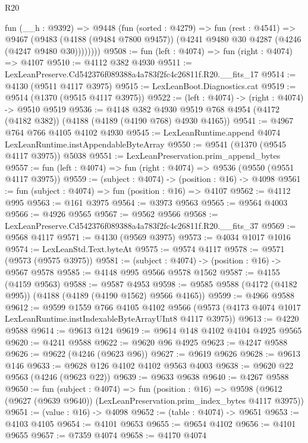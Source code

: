 \begin{lexlean}{R20}
\begin{coremodule}
        fun (__h : @9392) =>
        @9448
          (fun (sorted : @4279) =>
          fun (rest : @4541) =>
          @9467
            (@9483
              (@4188 (@9484 @7800 @9457))
              (@4241 @9480 @30 @4287 (@4246 (@4247 @9480 @30))))))))
@9508 := fun (left : @4074) => fun (right : @4074) => @4107
@9510 := @4112 @382 @4930
@9511 := LexLeanPreserve.Cd542376f089388a4a783f2fc4c26811f.R20.__fits_17
@9514 := @4130 (@9511 @4117 @3975)
@9515 := LexLeanBoot.Diagnostics.cat
@9519 := @9514 (@1370 (@9515 @4117 @3975))
@9522 := (left : @4074) -> (right : @4074) -> @9510 @9519
@9536 := @4148
    @382
    @4930
    @9519
    @768
    @4954
    (@4172 (@4182 @382))
    (@4188 (@4189 (@4190 @768) @4930 @4165))
@9541 := @4967 @764 @766 @4105 @4102 @4930
@9545 := LexLeanRuntime.append @4074 LexLeanRuntime.instAppendableByteArray
@9550 := @9541 (@1370 (@9545 @4117 @3975)) @5038
@9551 := LexLeanPreservation.prim_append_bytes
@9557 := fun (left : @4074) => fun (right : @4074) => @9536 (@9550 (@9551 @4117 @3975))
@9559 := (subject : @4074) -> (position : @16) -> @4098
@9561 := fun (subject : @4074) => fun (position : @16) => @4107
@9562 := @4112 @995
@9563 := @161 @3975
@9564 := @3973 @9563
@9565 := @9564 @4003
@9566 := @4926 @9565
@9567 := @9562 @9566
@9568 := LexLeanPreserve.Cd542376f089388a4a783f2fc4c26811f.R20.__fits_37
@9569 := @9568 @4117
@9571 := @4130 (@9569 @3975)
@9573 := @4034 @1017 @1016
@9574 := LexLeanStd.Text.byteAt
@9575 := @9574 @4117
@9578 := @9571 (@9573 (@9575 @3975))
@9581 := (subject : @4074) -> (position : @16) -> @9567 @9578
@9585 := @4148 @995 @9566 @9578 @1562
@9587 := @4155 (@4159 @9563)
@9588 := @9587 @4953
@9598 := @9585 @9588 (@4172 (@4182 @995)) (@4188 (@4189 (@4190 @1562) @9566 @4165))
@9599 := @4966 @9588
@9612 := @9599
    @1559
    @766
    @4105
    @4102
    @9566
    (@9573 (@4173 @4074 @1017 LexLeanRuntime.instIndexableByteArrayUInt8 @4117 @3975))
@9613 := @4220 @9588
@9614 := @9613 @124
@9619 := @9614 @148 @4102 @4104 @4925 @9565
@9620 := @4241 @9588
@9622 := @9620 @96 @4925
@9623 := @4247 @9588
@9626 := @9622 (@4246 (@9623 @96))
@9627 := @9619 @9626
@9628 := @9613 @146
@9633 := @9628 @126 @4102 @4102 @9563 @4003
@9638 := @9620 @22 @9563 (@4246 (@9623 @22))
@9639 := @9633 @9638
@9640 := @4267 @9588
@9650 := fun (subject : @4074) =>
  fun (position : @16) =>
  @9598 (@9612 (@9627 (@9639 @9640)) (LexLeanPreservation.prim_index_bytes @4117 @3975))
@9651 := (value : @16) -> @4098
@9652 := (table : @4074) -> @9651
@9653 := @4103 @4105
@9654 := @4101 @9653
@9655 := @9654 @4102
@9656 := @4101 @9655
@9657 := @7359 @4074
@9658 := @4170 @4074

\end{coremodule}
\end{lexlean}
